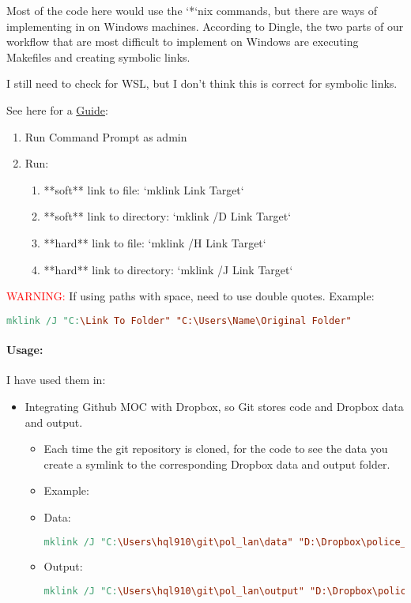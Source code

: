 Most of the code here would use the `*`nix commands, 
but there are ways of implementing in on Windows machines. 
According to Dingle, the two parts of our workflow that are most difficult to implement on Windows
are executing Makefiles and creating symbolic links.

I still need to check for WSL, but I don't think this is correct for symbolic links. 

See here for a \href{https://www.howtogeek.com/16226/complete-guide-to-symbolic-links-symlinks-on-windows-or-linux/}{Guide}:
\begin{enumerate}
    \item Run Command Prompt as admin
    \item Run:
    \begin{enumerate}
        \item **soft** link to file: `mklink Link Target`
        \item **soft** link to directory: `mklink /D Link Target`
        \item **hard** link to file: `mklink /H Link Target`
        \item **hard** link to directory: `mklink /J Link Target`
    \end{enumerate}
\end{enumerate}

\textcolor{red}{WARNING:} If using paths with space, need to use double quotes. 
Example:
\begin{lstlisting}[language=make]
        mklink /J "C:\Link To Folder" "C:\Users\Name\Original Folder"
\end{lstlisting}

\paragraph{Usage:}
I have used them in:
\begin{itemize}
    \item Integrating Github MOC with Dropbox, so Git stores code and Dropbox data and output. 
    \begin{itemize}
        \item Each time the git repository is cloned, for the code to see the data you create a symlink to the corresponding Dropbox data and output folder.
        \item Example:
        \item Data: 
        \begin{lstlisting}[language=make]
            mklink /J "C:\Users\hql910\git\pol_lan\data" "D:\Dropbox\police_language_rep\pol_lan\data"
        \end{lstlisting}
        \item Output: 
        \begin{lstlisting}[language=make]
            mklink /J "C:\Users\hql910\git\pol_lan\output" "D:\Dropbox\police_language_rep\pol_lan\output"
        \end{lstlisting}
    \end{itemize}
\end{itemize}


